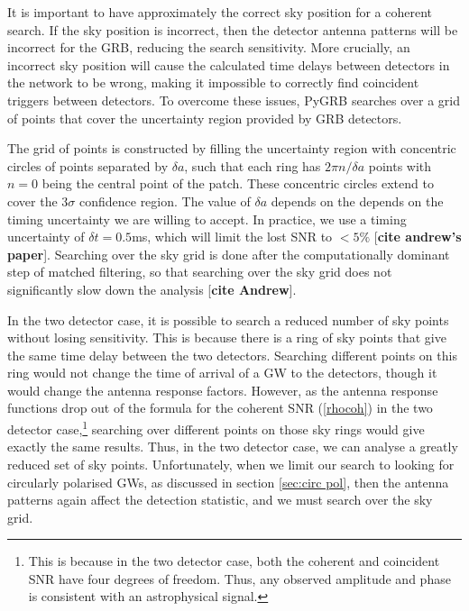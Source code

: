 \documentclass[11pt]{cuthesis}
\begin{document}
It is important to have approximately the correct sky position for a coherent search. If the sky position is incorrect, then the detector antenna patterns will be incorrect for the GRB, reducing the search sensitivity. More crucially, an incorrect sky position will cause the calculated time delays between detectors in the network to be wrong, making it impossible to correctly find coincident triggers between detectors. To overcome these issues, PyGRB searches over a grid of points that cover the uncertainty region provided by GRB detectors. 

The grid of points is constructed by filling the uncertainty region with concentric circles of points separated by $\delta a$, such that each ring has $2\pi n / \delta a$ points with $n=0$ being the central point of the patch. These concentric circles extend to cover the $3\sigma$ confidence region. The value of $\delta a$ depends on the depends on the timing uncertainty we are willing to accept. In practice, we use a timing uncertainty of $\delta t = 0.5$ms, which will limit the lost SNR to $<5\%$ [\textbf{cite andrew's paper}]. Searching over the sky grid is done after the computationally dominant step of matched filtering, so that searching over the sky grid does not significantly slow down the analysis [\textbf{cite Andrew}].

In the two detector case, it is possible to search a reduced number of sky points without losing sensitivity. This is because there is a ring of sky points that give the same time delay between the two detectors. Searching different points on this ring would not change the time of arrival of a GW to the detectors, though it would change the antenna response factors. However, as the antenna response functions drop out of the formula for the coherent SNR (\ref{rhocoh}) in the two detector case,\footnote{This is because in the two detector case, both the coherent and coincident SNR have four degrees of freedom. Thus, any observed amplitude and phase is consistent with an astrophysical signal.} searching over different points on those sky rings would give exactly the same results. Thus, in the two detector case, we can analyse a greatly reduced set of sky points. Unfortunately, when we limit our search to looking for circularly polarised GWs, as discussed in section \ref{sec:circ pol}, then the antenna patterns again affect the detection statistic, and we must search over the sky grid.
\end{document}
